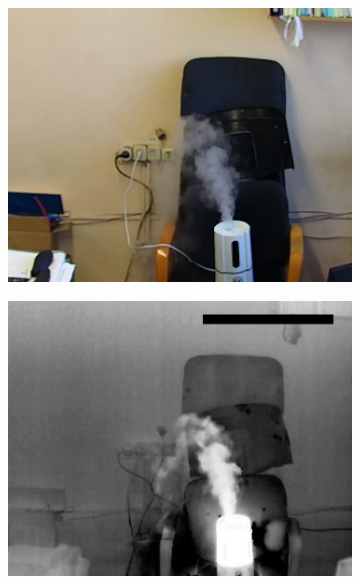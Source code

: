 \documentclass[14pt, a4paper]{extreport}
\begin{document}
\begin{figure}[h!]
\begin{subfigure}{.32\textwidth}
			\includegraphics[width = \textwidth]{image/chapter_3/examples/img/159}
			\caption{}
		\end{subfigure}
		\hspace{0.1cm}
		\begin{subfigure}{.32\textwidth}
			\centering
			\includegraphics[width = \textwidth]{image/chapter_3/examples/tep/159}
			\caption{}
		\end{subfigure}
		\hspace{0.1cm}
		\begin{subfigure}{.32\textwidth}
			\centering

\end{subfigure}
\end{figure}
\end{document}
